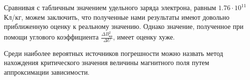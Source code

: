 Сравнивая с табличным значением удельного заряда электрона, равным $1.76 \cdot 10^{11}$ Кл/кг, можем заключить,
что полученные нами результаты имеют довольно приближенную оценку к реальному значению. Однако значение, 
полученное при помощи углового коэффициента $\frac{\Delta B^2_\text{кр}}{\Delta U}$, имеет оценку хуже.

Среди наиболее вероятных источников погрешности можно назвать метод нахождения критического значения
величины магнитного поля путем аппроксимации зависимости.
